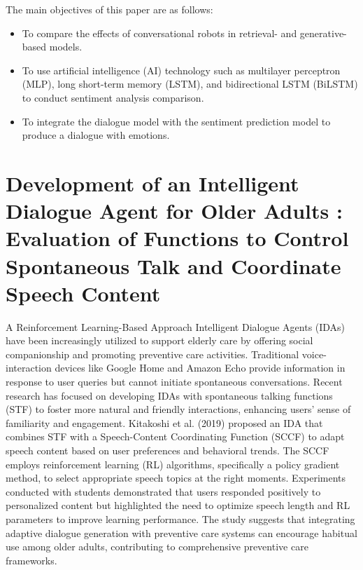The main objectives of this paper are as follows:
\begin{itemize}
	\item To compare the effects of conversational robots in retrieval- and generative-based models. 
	\item To use artificial intelligence (AI) technology such as multilayer perceptron (MLP), long short-term memory (LSTM), and bidirectional LSTM (BiLSTM) to conduct sentiment analysis comparison. 
	\item To integrate the dialogue model with the sentiment prediction model to produce a dialogue with emotions.
\end{itemize}



	\newpage
	\section[Development of an Intelligent Dialogue Agent for Older Adults : Evaluation of Functions to Control Spontaneous Talk and Coordinate Speech Content]{ Development of an Intelligent Dialogue Agent for Older Adults : Evaluation of Functions to Control Spontaneous Talk and Coordinate Speech Content \cite{paper_2}}
	\hspace*{17pt} A Reinforcement Learning-Based Approach Intelligent Dialogue Agents (IDAs) have been increasingly utilized to support elderly care by offering social companionship and promoting preventive care activities. Traditional voice-interaction devices like Google Home and Amazon Echo provide information in response to user queries but cannot initiate spontaneous conversations. Recent research has focused on developing IDAs with spontaneous talking functions (STF) to foster more natural and friendly interactions, enhancing users' sense of familiarity and engagement.
	Kitakoshi et al. (2019) proposed an IDA that combines STF with a Speech-Content Coordinating Function (SCCF) to adapt speech content based on user preferences and behavioral trends. The SCCF employs reinforcement learning (RL) algorithms, specifically a policy gradient method, to select appropriate speech topics at the right moments. Experiments conducted with students demonstrated that users responded positively to personalized content but highlighted the need to optimize speech length and RL parameters to improve learning performance. The study suggests that integrating adaptive dialogue generation with preventive care systems can encourage habitual use among older adults, contributing to comprehensive preventive care frameworks.	\

